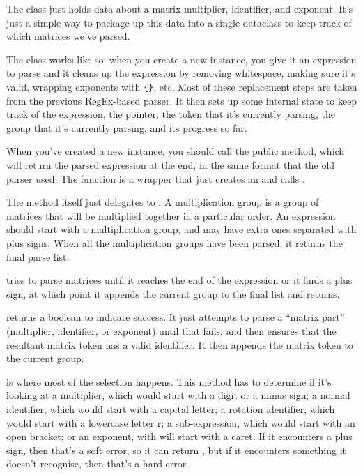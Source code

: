 \documentclass[../development.tex]{subfiles}
\begin{document}

The  class just holds data about a matrix multiplier, identifier, and exponent. It's just a simple way to package up this data into a single dataclass to keep track of which matrices we've parsed.

The  class works like so: when you create a new instance, you give it an expression to parse and it cleans up the expression by removing whitespace, making sure it's valid, wrapping exponents with \texttt{\{\}}, etc. Most of these replacement steps are taken from the previous RegEx-based parser. It then sets up some internal state to keep track of the expression, the pointer, the token that it's currently parsing, the group that it's currently parsing, and its progress so far.

When you've created a new instance, you should call the public  method, which will return the parsed expression at the end, in the same format that the old parser used. The  function is a wrapper that just creates an  and calls .

The  method itself just delegates to . A multiplication group is a group of matrices that will be multiplied together in a particular order. An expression should start with a multiplication group, and may have extra ones separated with plus signs. When all the multiplication groups have been parsed, it returns the final parse list.

 tries to parse matrices until it reaches the end of the expression or it finds a plus sign, at which point it appends the current group to the final list and returns.

 returns a boolean to indicate success. It just attempts to parse a \enquote{matrix part} (multiplier, identifier, or exponent) until that fails, and then ensures that the resultant matrix token has a valid identifier. It then appends the matrix token to the current group.

 is where most of the selection happens. This method has to determine if it's looking at a multiplier, which would start with a digit or a minus sign; a normal identifier, which would start with a capital letter; a rotation identifier, which would start with a lowercase letter r; a sub-expression, which would start with an open bracket; or an exponent, with will start with a caret. If it encounters a plus sign, then that's a soft error, so it can return , but if it encounters something it doesn't recognise, then that's a hard error.
\end{document}
